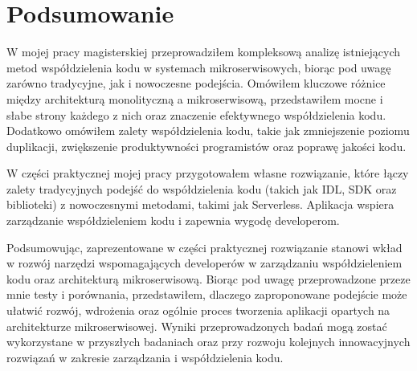\documentclass[runningheads,12pt]{llncs}
\begin{document}
\section{Podsumowanie}

W mojej pracy magisterskiej przeprowadziłem kompleksową analizę istniejących metod współdzielenia kodu w systemach mikroserwisowych, biorąc pod uwagę zarówno tradycyjne, jak i nowoczesne podejścia. Omówiłem kluczowe różnice między architekturą monolityczną a mikroserwisową, przedstawiłem mocne i słabe strony każdego z nich oraz znaczenie efektywnego współdzielenia kodu. Dodatkowo omówiłem zalety współdzielenia kodu, takie jak zmniejszenie poziomu duplikacji, zwiększenie produktywności programistów oraz poprawę jakości kodu.

W części praktycznej mojej pracy przygotowałem własne rozwiązanie, które łączy zalety tradycyjnych podejść do współdzielenia kodu (takich jak IDL, SDK oraz biblioteki) z nowoczesnymi metodami, takimi jak Serverless. Aplikacja wspiera zarządzanie współdzieleniem kodu i zapewnia wygodę developerom.

Podsumowując, zaprezentowane w części praktycznej rozwiązanie stanowi wkład w rozwój narzędzi wspomagających developerów w zarządzaniu współdzieleniem kodu oraz architekturą mikroserwisową. Biorąc pod uwagę przeprowadzone przeze mnie testy i porównania, przedstawiłem, dlaczego zaproponowane podejście może ułatwić rozwój, wdrożenia oraz ogólnie proces tworzenia aplikacji opartych na architekturze mikroserwisowej. Wyniki przeprowadzonych badań mogą zostać wykorzystane w przyszłych badaniach oraz przy rozwoju kolejnych innowacyjnych rozwiązań w zakresie zarządzania i współdzielenia kodu.

\nocite{*}

\listoftables

\listoffigures



\end{document}
